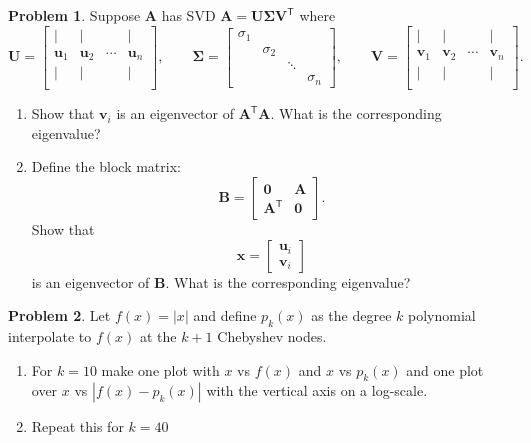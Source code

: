 \documentclass[12pt]{article}
\theoremstyle{definition}
\newtheorem{problem}{Problem}
\renewcommand{\vec}{\mathbf}
\newcommand{\T}{\mathsf{T}}
\begin{document}
\begin{problem}
    Suppose $\vec{A}$ has SVD $\vec{A} = \vec{U} \vec{\Sigma} \vec{V}^\T$ where 
    \[
        \vec{U} = 
        \begin{bmatrix}
            |&|&&|\\
            \vec{u}_1 & \vec{u}_2 & \cdots & \vec{u}_n\\
            |&|&&|\\
        \end{bmatrix},
        \qquad
        \vec{\Sigma} = \begin{bmatrix} \sigma_1 \\ &\sigma_2 \\ &&\ddots \\ &&& \sigma_n\end{bmatrix}
        ,\qquad
        \vec{V}
    =   \begin{bmatrix}
            |&|&&|\\
            \vec{v}_1 & \vec{v}_2 & \cdots & \vec{v}_n\\
            |&|&&|\\
        \end{bmatrix}. 
    \]
    \begin{enumerate}
        \item Show that $\vec{v}_i$ is an eigenvector of $\vec{A}^\T \vec{A}$. What is the corresponding eigenvalue?

        \item

    Define the block matrix:
    \[
        \vec{B} = 
        \begin{bmatrix} \vec{0}& \vec{A} \\ 
            \vec{A}^\T & \vec{0}
        \end{bmatrix}.
    \]
    Show that 
    \[
        \vec{x} = \begin{bmatrix} \vec{u}_i \\ \vec{v}_i \end{bmatrix}
    \]
    is an eigenvector of $\vec{B}$.
    What is the corresponding eigenvalue?
    \end{enumerate}
\end{problem}


\begin{problem}
    Let $f(x) = |x|$ and define $p_k(x)$ as the degree $k$ polynomial interpolate to $f(x)$ at the $k+1$ Chebyshev nodes. 
    \begin{enumerate}
        \item 
            For $k=10$ make one plot with $x$ vs $f(x)$ and $x$ vs $p_k(x)$  and one plot over $x$ vs $|f(x) - p_k(x)|$ with the vertical axis on a log-scale.

        \item 
            Repeat this for $k=40$


    \end{enumerate}
\end{problem}
\end{document}
